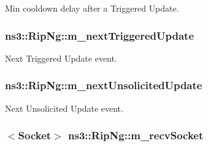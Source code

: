 Min cooldown delay after a Triggered Update. 

\subsubsection[{\texorpdfstring{m\+\_\+next\+Triggered\+Update}{m_nextTriggeredUpdate}}]{ ns3\+::\+Rip\+Ng\+::m\+\_\+next\+Triggered\+Update\hspace{0.3cm}{\ttfamily [private]}}\hypertarget{classns3_1_1RipNg_a382578c16a30ce7de28794defeb661e9}{}\label{classns3_1_1RipNg_a382578c16a30ce7de28794defeb661e9}


Next Triggered Update event. 

\subsubsection[{\texorpdfstring{m\+\_\+next\+Unsolicited\+Update}{m_nextUnsolicitedUpdate}}]{ ns3\+::\+Rip\+Ng\+::m\+\_\+next\+Unsolicited\+Update\hspace{0.3cm}{\ttfamily [private]}}\hypertarget{classns3_1_1RipNg_a673a77372c3bbc67338c52f6b0291134}{}\label{classns3_1_1RipNg_a673a77372c3bbc67338c52f6b0291134}


Next Unsolicited Update event. 

\subsubsection[{\texorpdfstring{m\+\_\+recv\+Socket}{m_recvSocket}}]{$<${\bf Socket}$>$ ns3\+::\+Rip\+Ng\+::m\+\_\+recv\+Socket\hspace{0.3cm}{\ttfamily [private]}}\hypertarget{classns3_1_1RipNg_a87437a46d9f4e0951f9d4c6b11208d4f}{}\label{classns3_1_1RipNg_a87437a46d9f4e0951f9d4c6b11208d4f}


